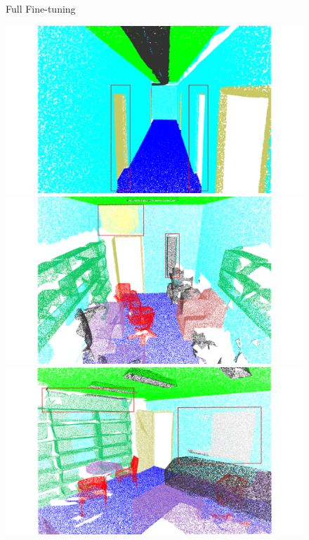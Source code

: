 \begin{figure}[htbp]
    \centering

    \begin{minipage}{0.1\textwidth}
        \centering
        Full
        Fine-tuning
    \end{minipage}
    \hfill
    \begin{minipage}{0.22\textwidth}
        \centering
        \includegraphics[width=\textwidth]{fig/supplement/semantic_segmentation/hallway_10/Full_hallway_10.pdf} %
    \end{minipage}
    \hfill
    \begin{minipage}{0.22\textwidth}
        \centering
        \includegraphics[width=\textwidth]{fig/supplement/semantic_segmentation/office_9/Full_office_9.pdf}
    \end{minipage}
    \hfill
    \begin{minipage}{0.22\textwidth}
        \centering
        \includegraphics[width=\textwidth]{fig/supplement/semantic_segmentation/office_35/Full_office_35.pdf}

\end{minipage}
\end{figure}
